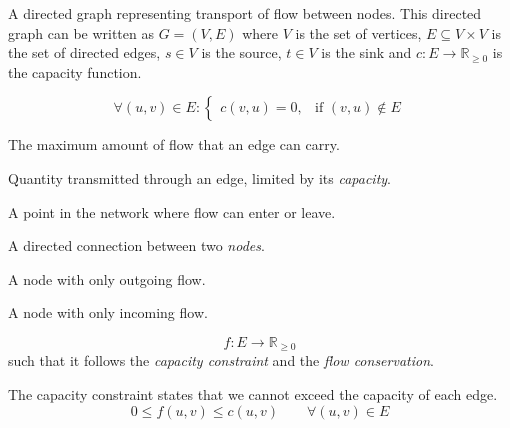 \documentclass[12pt, openany]{article}
\begin{document}
\begin{definition}
A directed graph representing transport of flow between nodes. This directed graph can be written as $G = (V,E)$ where \(V\) is the set of vertices, \(E \subseteq V \times V\) is the set of directed edges, \(s \in V\) is the source, \(t \in V\) is the sink and \(c : E \to \mathbb{R}_{\ge 0}\) is the capacity function.
\end{definition}

\begin{definition}
    \[
        \forall (u,v) \in E :
        \begin{cases}
        c(v,u) = 0, & \text{if } (v,u) \notin E
        \end{cases}
    \]
\end{definition}

\begin{definition}
The maximum amount of flow that an edge can carry.
\end{definition}

\begin{definition}[Flow]
Quantity transmitted through an edge, limited by its \emph{capacity}.
\end{definition}

\begin{definition}
A point in the network where flow can enter or leave.
\end{definition}

\begin{definition}
A directed connection between two \emph{nodes}.
\end{definition}

\begin{definition}[Source]
A node with only outgoing flow.
\end{definition}

\begin{definition}[Sink]
A node with only incoming flow.
\end{definition}

\begin{definition}
    \[
f : E \to \mathbb{R}_{\ge 0}
\]
such that it follows the \emph{capacity constraint} and the \emph{flow conservation}.
\end{definition}

\begin{definition}
The capacity constraint states that we cannot exceed the capacity of each edge.
\[
    0 \le f(u,v) \le c(u,v)
    \qquad \forall (u,v)\in E
    \]
\end{definition}
\end{document}
